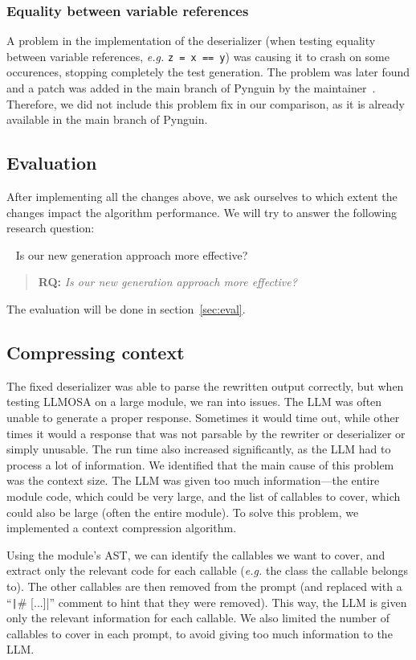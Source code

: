 \documentclass{article}
\makeatletter
\newcounter{rqcnt} %
\renewcommand{\therqcnt}{RQ\arabic{rqcnt}} %
\newcommand{\formatRQ}[2]{
    \begin{quote}
        \textbf{#1:} \textit{#2}
    \end{quote}
}
\newcommand{\RQ}[2]{ %
~\refstepcounter{rqcnt}\label{rq:#1} %
    \expandafter\gdef\csname stored@rq@#1\endcsname{#2} %
    \formatRQ{\therqcnt}{#2}
}
\makeatother
\begin{document}
\subsubsection{Equality between variable references}
A problem in the implementation of the deserializer (when testing equality between variable references, \textit{e.g.} \texttt{z = x == y}) was causing it to crash on some occurences, stopping completely the test generation. The problem was later found and a patch was added in the main branch of Pynguin by the maintainer~\cite{VariableRefAST.structural_eq_fix}. Therefore, we did not include this problem fix in our comparison, as it is already available in the main branch of Pynguin.

\subsection{Evaluation}
After implementing all the changes above, we ask ourselves to which extent the changes impact the algorithm performance. We will try to answer the following research question:

\RQ{approach}{Is our new generation approach more effective?}
The evaluation will be done in section~\ref{sec:eval}.

\subsection{Compressing context}
The fixed deserializer was able to parse the rewritten output correctly, but when testing LLMOSA on a large module, we ran into issues. The LLM was often unable to generate a proper response. Sometimes it would time out, while other times it would a response that was not parsable by the rewriter or deserializer or simply unusable.
The run time also increased significantly, as the LLM had to process a lot of information.
We identified that the main cause of this problem was the context size. The LLM was given too much information---the entire module code, which could be very large, and the list of callables to cover, which could also be large (often the entire module).
To solve this problem, we implemented a context compression algorithm.

Using the module's AST, we can identify the callables we want to cover, and extract only the relevant code for each callable (\textit{e.g.} the class the callable belongs to). The other callables are then removed from the prompt (and replaced with a ``\texttt|# [...]|'' comment to hint that they were removed). This way, the LLM is given only the relevant information for each callable. We also limited the number of callables to cover in each prompt, to avoid giving too much information to the LLM.
\end{document}
